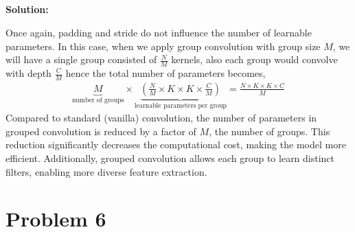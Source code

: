 \documentclass{article}
\newenvironment{solution}
  {\par\noindent\textbf{Solution:}\par}
  {\par}
\begin{document}
\subsection{}
\begin{solution}
    Once again, padding and stride do not influence the number of learnable parameters. In this case, when we apply group convolution with group size $M$, 
    we will have a single group consisted of $\frac{N}{M}$ kernels, also each group would convolve with depth $\frac{C}{M}$ hence the total number of parameters becomes,
    \[
    \begin{aligned}
      \underbrace{M}_{\text{number of groups}} \times \underbrace{\left( \frac{N}{M} \times K \times K \times \frac{C}{M} \right)}_{\text{learnable parameters per group}} = \frac{N \times K \times K \times C}{M}
    \end{aligned}
    \]
Compared to standard (vanilla) convolution, the number of parameters in grouped convolution is reduced by a factor of \( M \), the number of groups. This reduction significantly decreases the computational cost, making the model more efficient. Additionally, grouped convolution allows each group to learn distinct filters, enabling more diverse feature extraction.
\end{solution}

\section{Problem 6}
\end{document}
